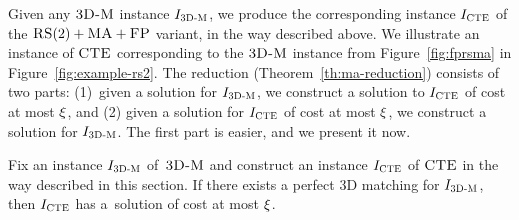 
 \bigskip
 
 Given any $\textsc{3D-M}$ instance $I_{\mathrm{\textsc{3D-M}}}$, we produce the corresponding instance $I_{\mathrm{\textsc{CTE}}}$ of the $\textsc{RS}(2)+\textsc{MA}+\textsc{FP}$ variant, in the way described above.
 We illustrate an instance of $\textsc{CTE}$ corresponding to the $\textsc{3D-M}$ instance from Figure~\ref{fig:fprsma} in Figure~\ref{fig:example-rs2}.
 The reduction (Theorem~\ref{th:ma-reduction}) consists of two parts: (1)~given a solution for $I_{\mathrm{\textsc{3D-M}}}$, we construct a solution to $I_{\mathrm{\textsc{CTE}}}$ of cost at most $\xi$, and (2) given a solution for $I_{\mathrm{\textsc{CTE}}}$ of cost at most $\xi$, we construct a solution for $I_{\mathrm{\textsc{3D-M}}}$.
 The first part is easier, and we present it now.
\begin{lemma}
  Fix an instance $I_{\mathrm{\textsc{3D-M}}}$ of~$\textsc{3D-M}$ and construct an instance $I_{\mathrm{\textsc{CTE}}}$ of $\textsc{CTE}$ in the way described in this section.
  If there exists a perfect 3D matching for $I_{\mathrm{\textsc{3D-M}}}$, then $I_{\mathrm{\textsc{CTE}}}$ has a~solution of cost at most $\xi$.
    \label{lem:ma-reduction-left}
\end{lemma}
